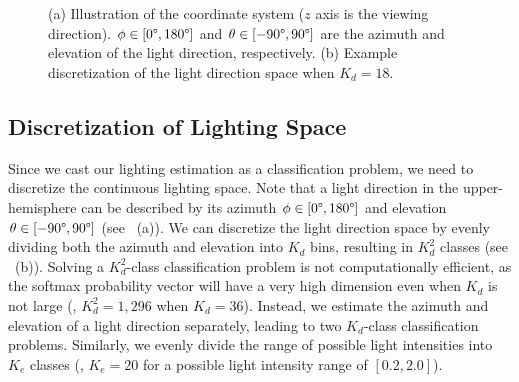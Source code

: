 \begin{figure}[htbp] \centering
    
     \\ \vspace{-0.9em} 
     \\
    \caption[Illustration of an example discretization of the lighting space]{(a) Illustration of the coordinate system ($z$ axis is the viewing direction). $\phi \in [0\degree, 180\degree]$ and $\theta \in [-90\degree, 90\degree]$ are the azimuth and elevation of the light direction, respectively. (b) Example discretization of the light direction space when $K_d=18$.} \label{fig:coord}
\end{figure}

\subsection{Discretization of Lighting Space} Since we cast our lighting estimation as a classification problem, we need to discretize the continuous lighting space. Note that a light direction in the upper-hemisphere can be described by its azimuth $\phi \in [0\degree, 180\degree]$ and elevation $\theta \in [-90\degree, 90\degree]$ (see ~(a)). We can discretize the light direction space by evenly dividing both the azimuth and elevation into $K_d$ bins, resulting in $K_d^2$ classes (see ~(b)). Solving a $K_d^2$-class classification problem is not computationally efficient, as the softmax probability vector will have a very high dimension even when $K_d$ is not large (\eg, $K_d^2=1,296$ when $K_d=36$). 
Instead, we estimate the azimuth and elevation of a light direction separately, leading to two $K_d$-class classification problems. Similarly, we evenly divide the range of possible light intensities into $K_e$ classes (\eg, $K_e=20$ for a possible light intensity range of $[0.2, 2.0]$).

